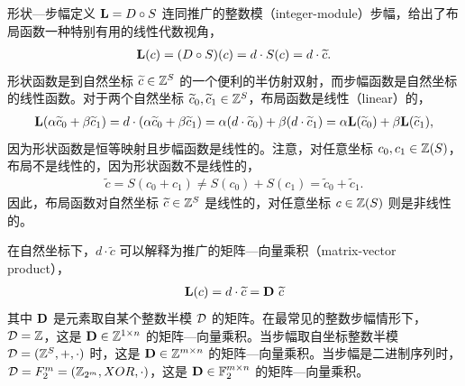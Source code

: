 
形状—步幅定义 $\mathbf{L} = D \circ S$ 连同推广的整数模（integer-module）步幅，给出了布局函数一种特别有用的线性代数视角，
\begin{align}
\mathbf{L}(c) = (D \circ S)(c) = d \cdot S(c) = d \cdot \widetilde{c}.
\end{align}
形状函数是到自然坐标 $\widetilde{c} \in \mathbb{Z}^S$ 的一个便利的半仿射双射，而步幅函数是自然坐标的线性函数。对于两个自然坐标 $\widetilde{c}_0, \widetilde{c}_1 \in \mathbb{Z}^S$，布局函数是线性（linear）的，
\begin{align*}
\mathbf{L}(\alpha \widetilde{c}_0 + \beta \widetilde{c}_1) = d \cdot (\alpha \widetilde{c}_0 + \beta \widetilde{c}_1) = \alpha (d \cdot \widetilde{c}_0) + \beta (d \cdot \widetilde{c}_1) = \alpha \mathbf{L}(\widetilde{c}_0) + \beta \mathbf{L}(\widetilde{c}_1),
\end{align*}
因为形状函数是恒等映射且步幅函数是线性的。注意，对任意坐标 $c_0, c_1 \in \mathbb{Z}(S)$，布局不是线性的，因为形状函数不是线性的，
\begin{align*}
\tilde{c} = S(c_0 + c_1) \neq S(c_0) + S(c_1) = \tilde{c}_0 + \tilde{c}_1.
\end{align*}
因此，布局函数对自然坐标 $\widetilde{c} \in \mathbb{Z}^S$ 是线性的，对任意坐标 $c \in \mathbb{Z}(S)$ 则是非线性的。

在自然坐标下，$d \cdot \tilde{c}$ 可以解释为推广的矩阵—向量乘积（matrix-vector product），
\begin{align*}
\mathbf{L}(c) = d \cdot \widetilde{c} = \mathbf{D} \ \widetilde{c}
\end{align*}
其中 $\mathbf{D}$ 是元素取自某个整数半模 $\mathcal{D}$ 的矩阵。在最常见的整数步幅情形下，$\mathcal{D} = \mathbb{Z}$，这是 $\mathbf{D} \in \mathbb{Z}^{1 \times n}$ 的矩阵—向量乘积。当步幅取自坐标整数半模 $\mathcal{D} = (\mathbb{Z}^S, +, \cdot)$ 时，这是 $\mathbf{D} \in \mathbb{Z}^{m \times n}$ 的矩阵—向量乘积。当步幅是二进制序列时，$\mathcal{D} = F_2^m = (\mathbb{Z}_{2^m}, XOR, \cdot)$，这是 $\mathbf{D} \in \mathbb{F}_2^{m \times n}$ 的矩阵—向量乘积。

